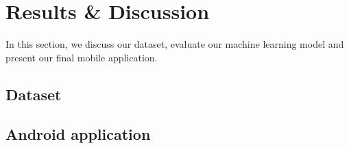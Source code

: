 \section{Results \& Discussion}\label{sec:results}

In this section, we discuss our dataset, evaluate our machine learning model and present our final mobile application.
\subsection{Dataset}


\subsection{Android application}
